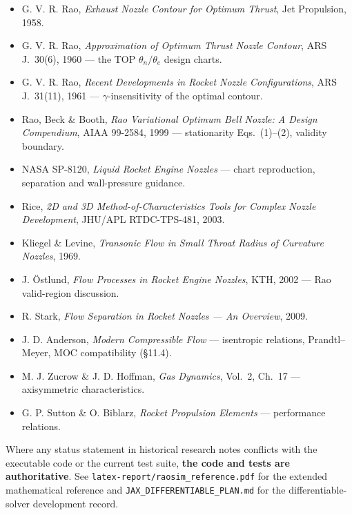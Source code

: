 \documentclass[11pt]{article}
\newcommand{\code}[1]{\texttt{#1}}
\begin{document}
\begin{itemize}
\item G. V. R. Rao, \emph{Exhaust Nozzle Contour for Optimum Thrust}, Jet
Propulsion, 1958.
\item G. V. R. Rao, \emph{Approximation of Optimum Thrust Nozzle Contour}, ARS
J.\ 30(6), 1960 --- the TOP $\theta_n/\theta_e$ design charts.
\item G. V. R. Rao, \emph{Recent Developments in Rocket Nozzle
Configurations}, ARS J.\ 31(11), 1961 --- $\gamma$-insensitivity of the
optimal contour.
\item Rao, Beck \& Booth, \emph{Rao Variational Optimum Bell Nozzle: A Design
Compendium}, AIAA 99-2584, 1999 --- stationarity Eqs.~(1)--(2), validity
boundary.
\item NASA SP-8120, \emph{Liquid Rocket Engine Nozzles} --- chart
reproduction, separation and wall-pressure guidance.
\item Rice, \emph{2D and 3D Method-of-Characteristics Tools for Complex Nozzle
Development}, JHU/APL RTDC-TPS-481, 2003.
\item Kliegel \& Levine, \emph{Transonic Flow in Small Throat Radius of
Curvature Nozzles}, 1969.
\item J. \"Ostlund, \emph{Flow Processes in Rocket Engine Nozzles}, KTH, 2002
--- Rao valid-region discussion.
\item R. Stark, \emph{Flow Separation in Rocket Nozzles --- An Overview}, 2009.
\item J. D. Anderson, \emph{Modern Compressible Flow} --- isentropic
relations, Prandtl--Meyer, MOC compatibility (\S11.4).
\item M. J. Zucrow \& J. D. Hoffman, \emph{Gas Dynamics}, Vol.\ 2, Ch.\ 17 ---
axisymmetric characteristics.
\item G. P. Sutton \& O. Biblarz, \emph{Rocket Propulsion Elements} ---
performance relations.
\end{itemize}

\begin{notebox}
\small Where any status statement in historical research notes conflicts with
the executable code or the current test suite, \textbf{the code and tests are
authoritative}. See \code{latex-report/raosim\_reference.pdf} for the extended
mathematical reference and \code{JAX\_DIFFERENTIABLE\_PLAN.md} for the
differentiable-solver development record.
\end{notebox}
\end{document}

